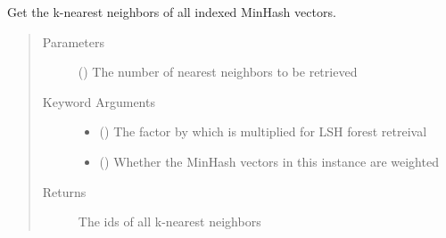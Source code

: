 \documentclass[letterpaper,10pt,english]{sphinxmanual}
\begin{document}
\begin{fulllineitems}
\begin{fulllineitems}
\begin{quote}
\begin{description}
\end{description}\end{quote}

\end{fulllineitems}


\begin{fulllineitems}
\label{\detokenize{documentation:tmap.LSHForest.get_all_nearest_neighbors}}
Get the k-nearest neighbors of all indexed MinHash vectors.
\begin{quote}\begin{description}
\item[{Parameters}] \leavevmode
{} () \textendash{} The number of nearest neighbors to be retrieved

\item[{Keyword Arguments}] \leavevmode\begin{itemize}
\item {} 
 () \textendash{} The factor by which  is multiplied for LSH forest retreival

\item {} 
 () \textendash{} Whether the MinHash vectors in this {\hyperref[\detokenize{documentation:tmap.LSHForest}]{}} instance are weighted

\end{itemize}

\item[{Returns}] \leavevmode
{} The ids of all k-nearest neighbors

\end{description}\end{quote}

\end{fulllineitems}



\end{fulllineitems}
\end{document}

